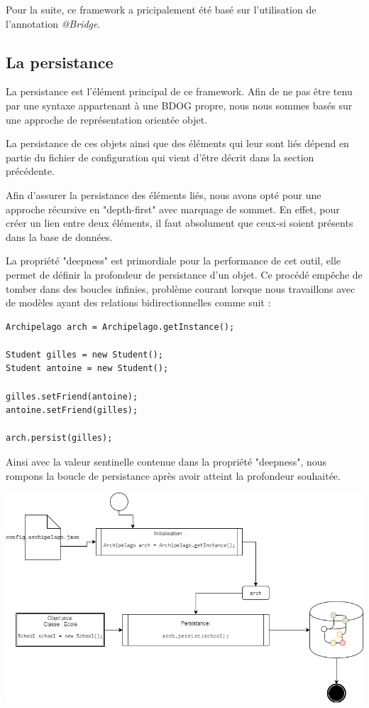 \documentclass[a4paper,fleqn,12pt]{report}
\begin{document}
Pour la suite, ce framework a pricipalement été basé sur l'utilisation de l'annotation \textit{@Bridge}.

\subsection{La persistance}


La persistance est l'élément principal de ce framework. Afin de ne pas être tenu par une syntaxe appartenant à une BDOG propre, nous nous sommes basés sur une approche de représentation orientée objet. 

La persistance de ces objets ainsi que des éléments qui leur sont liés dépend en partie du fichier de configuration qui vient d'être décrit dans la section précédente. 

Afin d'assurer la persistance des éléments liés, nous avons opté pour une approche récursive en "depth-first" avec marquage de sommet. En effet, pour créer un lien entre deux éléments, il faut absolument que ceux-si soient présents dans la base de données.

La propriété "deepness" est primordiale pour la performance de cet outil, elle permet de définir la profondeur de persistance d'un objet. Ce procédé empêche de tomber dans des boucles infinies, problème courant lorsque nous travaillons avec de modèles ayant des relations bidirectionnelles comme suit : 

\begin{lstlisting}
Archipelago arch = Archipelago.getInstance();

Student gilles = new Student();
Student antoine = new Student();

gilles.setFriend(antoine);
antoine.setFriend(gilles);

arch.persist(gilles);
\end{lstlisting}

Ainsi avec la valeur sentinelle contenue dans la propriété "deepness", nous rompons la boucle de persistance après avoir atteint la profondeur souhaitée.

\begin{center}
\includegraphics[scale=0.5]{figures/Persist.png}
\label{fig:Persist}
\end{center}
    
\end{document}
